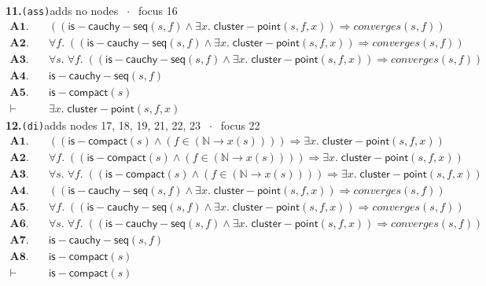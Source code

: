 \documentclass[11pt]{article}
\begin{document}
\medskip\noindent\textbf{11.}\quad \texttt{(ass)}\hfill{\small adds no nodes $\;\cdot\;$ focus 16}\\[2pt]
\begin{align*}
  \mathbf{A1.}\quad & ((\mathsf{is{-}cauchy{-}seq}(s, f) \wedge \exists x.\; \mathsf{cluster{-}point}(s, f, x)) \Rightarrow \mathit{converges}(s, f)) \\
  \mathbf{A2.}\quad & \forall f.\; ((\mathsf{is{-}cauchy{-}seq}(s, f) \wedge \exists x.\; \mathsf{cluster{-}point}(s, f, x)) \Rightarrow \mathit{converges}(s, f)) \\
  \mathbf{A3.}\quad & \forall s.\; \forall f.\; ((\mathsf{is{-}cauchy{-}seq}(s, f) \wedge \exists x.\; \mathsf{cluster{-}point}(s, f, x)) \Rightarrow \mathit{converges}(s, f)) \\
  \mathbf{A4.}\quad & \mathsf{is{-}cauchy{-}seq}(s, f) \\
  \mathbf{A5.}\quad & \mathsf{is{-}compact}(s) \\
  \vdash\quad & \exists x.\; \mathsf{cluster{-}point}(s, f, x)
\end{align*}
\medskip\noindent\textbf{12.}\quad \texttt{(di)}\hfill{\small adds nodes 17, 18, 19, 21, 22, 23 $\;\cdot\;$ focus 22}\\[2pt]
\begin{align*}
  \mathbf{A1.}\quad & ((\mathsf{is{-}compact}(s) \wedge (f \in (\mathbb{N} \to x(s)))) \Rightarrow \exists x.\; \mathsf{cluster{-}point}(s, f, x)) \\
  \mathbf{A2.}\quad & \forall f.\; ((\mathsf{is{-}compact}(s) \wedge (f \in (\mathbb{N} \to x(s)))) \Rightarrow \exists x.\; \mathsf{cluster{-}point}(s, f, x)) \\
  \mathbf{A3.}\quad & \forall s.\; \forall f.\; ((\mathsf{is{-}compact}(s) \wedge (f \in (\mathbb{N} \to x(s)))) \Rightarrow \exists x.\; \mathsf{cluster{-}point}(s, f, x)) \\
  \mathbf{A4.}\quad & ((\mathsf{is{-}cauchy{-}seq}(s, f) \wedge \exists x.\; \mathsf{cluster{-}point}(s, f, x)) \Rightarrow \mathit{converges}(s, f)) \\
  \mathbf{A5.}\quad & \forall f.\; ((\mathsf{is{-}cauchy{-}seq}(s, f) \wedge \exists x.\; \mathsf{cluster{-}point}(s, f, x)) \Rightarrow \mathit{converges}(s, f)) \\
  \mathbf{A6.}\quad & \forall s.\; \forall f.\; ((\mathsf{is{-}cauchy{-}seq}(s, f) \wedge \exists x.\; \mathsf{cluster{-}point}(s, f, x)) \Rightarrow \mathit{converges}(s, f)) \\
  \mathbf{A7.}\quad & \mathsf{is{-}cauchy{-}seq}(s, f) \\
  \mathbf{A8.}\quad & \mathsf{is{-}compact}(s) \\
  \vdash\quad & \mathsf{is{-}compact}(s)
\end{align*}
\end{document}

